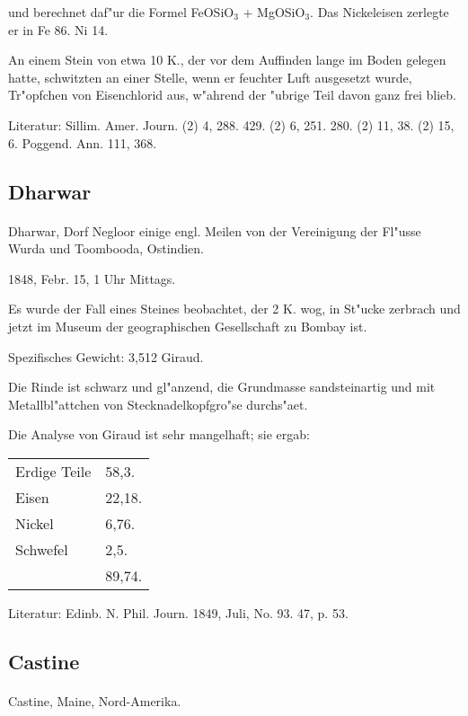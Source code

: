 \documentclass[a4paper, 11pt, oneside]{article}
\begin{document}
und berechnet daf"ur die Formel FeOSiO$_{3}$ + MgOSiO$_{3}$. Das Nickeleisen zerlegte er in Fe 86. Ni 14.

An einem Stein von etwa 10 K., der vor dem Auffinden lange im Boden gelegen hatte, schwitzten an einer Stelle, wenn er feuchter Luft ausgesetzt wurde, Tr"opfchen von Eisenchlorid aus, w"ahrend der "ubrige Teil davon ganz frei blieb.

\footnotesize
Literatur: Sillim. Amer. Journ. (2) 4, 288. 429. (2) 6, 251. 280. (2) 11, 38. (2) 15, 6. Poggend. Ann. 111, 368.

\subsection{Dharwar}
\normalsize
\paragraph{}
Dharwar, Dorf Negloor einige engl. Meilen von der Vereinigung der Fl"usse Wurda und Toombooda, Ostindien.

1848, Febr. 15, 1 Uhr Mittags.

Es wurde der Fall eines Steines beobachtet, der 2 K. wog, in St"ucke zerbrach und jetzt im Museum der geographischen Gesellschaft zu Bombay ist.

Spezifisches Gewicht: 3,512 Giraud.

Die Rinde ist schwarz und gl"anzend, die Grundmasse sandsteinartig und mit Metallbl"attchen von Stecknadelkopfgro"se durchs"aet.

Die Analyse von Giraud ist sehr mangelhaft; sie ergab:
\begin{table}[H]
    \centering
    \begin{tabular}{l l}
        Erdige Teile & 58,3. \\
        Eisen & 22,18. \\
        Nickel & 6,76. \\
        Schwefel & 2,5. \\
         & 89,74. \\
    \end{tabular}
\end{table}

\footnotesize
Literatur: Edinb. N. Phil. Journ. 1849, Juli, No. 93. 47, p. 53.

\subsection{Castine}
\normalsize
\paragraph{}
Castine, Maine, Nord-Amerika.
\end{document}

